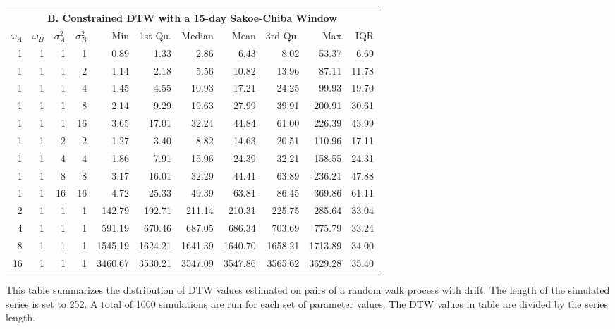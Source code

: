 \begin{table}[!ht]
\begin{threeparttable}
\begin{tabular}{r r r r | r r r r r r r}
            \\
            \\
            \multicolumn{11}{c}{\textbf{B. Constrained DTW with a 15-day Sakoe-Chiba Window}} \\
            \midrule
            $\omega_{A}$ & $\omega_{B}$ & $\sigma^{2}_{A}$ & $\sigma^{2}_{B}$ & Min & 1st Qu. & Median & Mean & 3rd Qu. & Max & IQR \\
            \midrule
            1  & 1 & 1  & 1  &    0.89 &    1.33 &    2.86 &    6.43 &    8.02 &   53.37 &  6.69 \\
            \midrule
            1  & 1 & 1  & 2  &    1.14 &    2.18 &    5.56 &   10.82 &   13.96 &   87.11 & 11.78 \\
            1  & 1 & 1  & 4  &    1.45 &    4.55 &   10.93 &   17.21 &   24.25 &   99.93 & 19.70 \\
            1  & 1 & 1  & 8  &    2.14 &    9.29 &   19.63 &   27.99 &   39.91 &  200.91 & 30.61 \\
            1  & 1 & 1  & 16 &    3.65 &   17.01 &   32.24 &   44.84 &   61.00 &  226.39 & 43.99 \\
            \midrule
            1  & 1 & 2  & 2  &    1.27 &    3.40 &    8.82 &   14.63 &   20.51 &  110.96 & 17.11 \\
            1  & 1 & 4  & 4  &    1.86 &    7.91 &   15.96 &   24.39 &   32.21 &  158.55 & 24.31 \\
            1  & 1 & 8  & 8  &    3.17 &   16.01 &   32.29 &   44.41 &   63.89 &  236.21 & 47.88 \\
            1  & 1 & 16 & 16 &    4.72 &   25.33 &   49.39 &   63.81 &   86.45 &  369.86 & 61.11 \\
            \midrule
            2  & 1 & 1  & 1  &  142.79 &  192.71 &  211.14 &  210.31 &  225.75 &  285.64 & 33.04 \\
            4  & 1 & 1  & 1  &  591.19 &  670.46 &  687.05 &  686.34 &  703.69 &  775.79 & 33.24 \\
            8  & 1 & 1  & 1  & 1545.19 & 1624.21 & 1641.39 & 1640.70 & 1658.21 & 1713.89 & 34.00 \\
            16 & 1 & 1  & 1  & 3460.67 & 3530.21 & 3547.09 & 3547.86 & 3565.62 & 3629.28 & 35.40 \\
            \hline
        \end{tabular}
        \begin{tablenotes}
            \item{This table summarizes the distribution of DTW values estimated on pairs of a random walk process with drift. The length of the simulated series is set to 252. A total of 1000 simulations are run for each set of parameter values. The DTW values in table are divided by the series length.}

\end{tablenotes}
\end{threeparttable}
\end{table}
